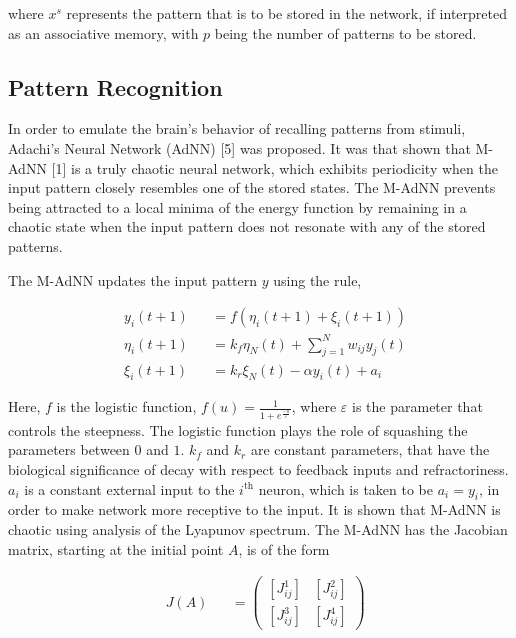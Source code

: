 \documentclass[12pt, letterpaper]{article}
\begin{document}
where $x^s$ represents the pattern that is to be stored in the network, if interpreted as an associative memory, with $p$ being the number of patterns to be stored.

\subsection*{Pattern Recognition}

In order to emulate the brain's behavior of recalling patterns from stimuli, Adachi’s Neural Network (AdNN) [5] was proposed. It was that shown that M-AdNN [1] is a truly chaotic neural network, which exhibits periodicity when the input pattern closely resembles one of the stored states. The M-AdNN prevents being attracted to a local minima of the energy function by remaining in a chaotic state when the input pattern does not resonate with any of the stored patterns.

The M-AdNN updates the input pattern $y$ using the rule,

$$
\begin{aligned}
& y_i(t+1) &&= f(\eta_i(t+1) + \xi_i(t+1))\\
& \eta_i(t+1) &&= k_f \eta_N(t) + \sum_{j = 1}^N w_{ij} y_j(t)\\
& \xi_i(t+1) &&= k_r \xi_N(t) - \alpha y_i(t) + a_i
\end{aligned}
$$

Here, $f$ is the logistic function, $f(u) = \frac{1}{1 + e^\frac{-u}{\varepsilon}}$, where $\varepsilon$ is the parameter that controls the steepness. The logistic function plays the role of squashing the parameters between $0$ and $1$. $k_f$ and $k_r$ are constant parameters, that have the biological significance of decay with respect to feedback inputs and refractoriness. $a_i$ is a constant external input to the $i^{\text{th}}$ neuron, which is taken to be $a_i = y_i$, in order to make network more receptive to the input. It is shown that M-AdNN is chaotic using analysis of the Lyapunov spectrum. The M-AdNN has the Jacobian matrix, starting at the initial point $A$, is of the form

$$
\begin{aligned}
& J(A) &&= \begin{pmatrix}
  [J_{ij}^1] & [J_{ij}^2]\\
  [J_{ij}^3] & [J_{ij}^4]
  \end{pmatrix}\\
\end{aligned}
$$
\end{document}
